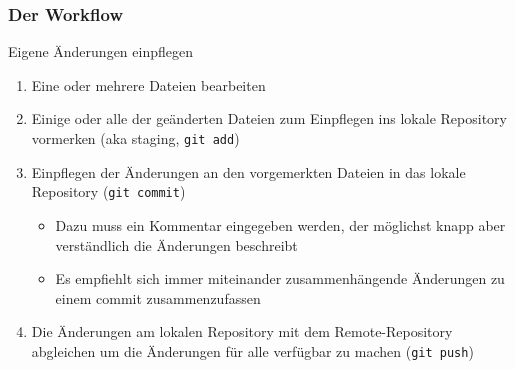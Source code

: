 \documentclass{beamer}
\begin{document}
\begin{frame}
  \frametitle{Der Workflow}

  \begin{block}{Eigene Änderungen einpflegen}
  \begin{enumerate}
    \item Eine oder mehrere Dateien bearbeiten
    \item Einige oder alle der geänderten Dateien zum Einpflegen ins lokale Repository vormerken (aka staging, \texttt{git add})
    \item Einpflegen der Änderungen an den vorgemerkten Dateien in das lokale Repository (\texttt{git commit})
      \begin{itemize}
      \item Dazu muss ein Kommentar eingegeben werden, der möglichst knapp aber verständlich die Änderungen beschreibt
      \item Es empfiehlt sich immer miteinander zusammenhängende Änderungen zu einem commit zusammenzufassen
      \end{itemize}
    \item Die Änderungen am lokalen Repository mit dem Remote-Repository abgleichen um die Änderungen für alle verfügbar zu machen (\texttt{git push})
  \end{enumerate}
  \end{block}

\end{frame}



\end{document}
